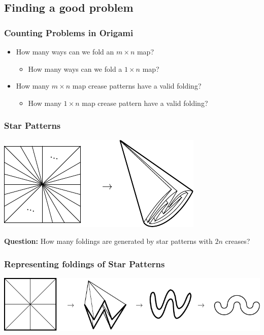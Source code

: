 \documentclass{beamer}
\begin{document}
\subsection{Finding a good problem}
\begin{frame}
\frametitle{Counting Problems in Origami}
\begin{itemize}
\item How many ways can we fold an $m\times n$ map?
	\begin{itemize}
	\item<2-> How many ways can we fold a $1\times n$ map?
	\end{itemize}
\item How many $m\times n$ map crease patterns have a valid folding?
	\begin{itemize}
	\item<3-> How many $1\times n$ map crease pattern have a valid folding?
	\end{itemize}
\end{itemize}
\end{frame}

\begin{frame}
\frametitle{Star Patterns}
\pause
\begin{center}
\includegraphics[width=.8\textwidth]{meanders/star-cp.pdf}
\end{center}
\pause
\textbf{Question:} How many foldings are generated by star patterns with $2n$ creases?
\end{frame}

\begin{frame}
\frametitle{Representing foldings of Star Patterns}
\pause
\begin{center}
\includegraphics[width=\textwidth]{meanders/star-to-meander.pdf}
\end{center}
\end{frame}
\end{document}
